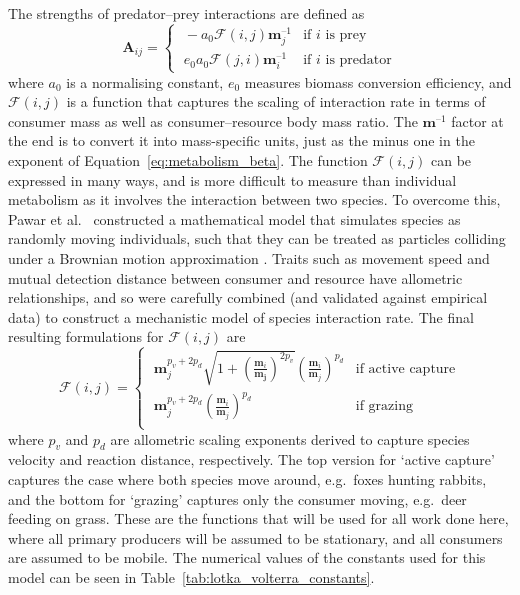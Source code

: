 The strengths of predator--prey interactions are defined as
\begin{equation}
  \mathbf{A}_{ij} =
  \begin{cases}
    \;-a_0\mathcal{F}(i,j)\mathbf{m}_j^{\text{--}1} & \text{if $i$ is prey}\\
    \;e_0a_0\mathcal{F}(j,i)\mathbf{m}_i^{\text{--}1} & \text{if $i$ is predator}
  \end{cases}
  \label{eq:interaction_strength}
\end{equation}
where $a_0$ is a normalising constant, $e_0$ measures biomass conversion efficiency, and $\mathcal{F}(i,j)$ is a function that captures the scaling of interaction rate in terms of consumer mass as well as consumer--resource body mass ratio. The $\mathbf{m}^{\text{--}1}$ factor at the end is to convert it into mass-specific units, just as the minus one in the exponent of Equation~\eqref{eq:metabolism_beta}.
The function $\mathcal{F}(i,j)$ can be expressed in many ways, and is more difficult to measure than individual metabolism as it involves the interaction between two species. To overcome this, Pawar et al.\ \cite{Pawar2012} constructed a mathematical model that simulates species as randomly moving individuals, such that they can be treated as particles colliding under a Brownian motion approximation \cite{Ocubo1980}. Traits such as movement speed and mutual detection distance between consumer and resource have allometric relationships, and so were carefully combined (and validated against empirical data) to construct a mechanistic model of species interaction rate.
The final resulting formulations for $\mathcal{F}(i,j)$ are
\begin{equation}
  \mathcal{F}(i,j) =
  \begin{cases}
    \;\mathbf{m}_j^{p_v+2p_d} \sqrt{1+\left(\frac{\mathbf{m}_i}{\mathbf{m_j}}\right)^{2p_v}}\left(\frac{\mathbf{m}_i}{\mathbf{m}_j}\right)^{p_d} & \text{if active capture}\\
    \;\mathbf{m}_j^{p_v+2p_d} \left(\frac{\mathbf{m}_i}{\mathbf{m}_j}\right)^{p_d} & \text{if grazing}\\
  \end{cases}
\end{equation}
where $p_v$ and $p_d$ are allometric scaling exponents derived to capture species velocity and reaction distance, respectively. The top version for `active capture' captures the case where both species move around, e.g.\ foxes hunting rabbits, and the bottom for `grazing' captures only the consumer moving, e.g.\ deer feeding on grass. These are the functions that will be used for all work done here, where all primary producers will be assumed to be stationary, and all consumers are assumed to be mobile.
The numerical values of the constants used for this model can be seen in Table~\ref{tab:lotka_volterra_constants}.

